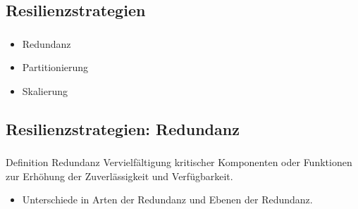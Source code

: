 \subsection{\textbf{Resilienzstrategien}}
\begin{frame}
    \frametitle{\insertsection}
    \framesubtitle{\insertsubsection}

    \begin{itemize}
        \item Redundanz
        \item Partitionierung
        \item Skalierung
    \end{itemize}
\end{frame}

\subsection{Resilienzstrategien: Redundanz}
\begin{frame}
    \frametitle{\insertsection}
    \framesubtitle{\insertsubsection}

    \begin{block}{Definition Redundanz}
        Vervielfältigung kritischer Komponenten oder Funktionen zur Erhöhung der Zuverlässigkeit und Verfügbarkeit.\\
        \begin{itemize}
            \item Unterschiede in Arten der Redundanz und Ebenen der Redundanz.
        \end{itemize}
    \end{block}
\end{frame}


